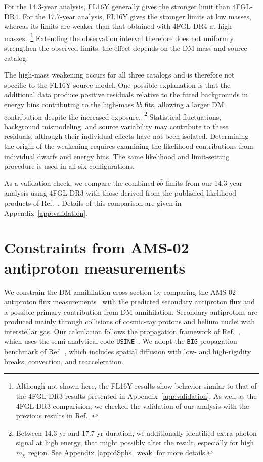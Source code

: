 \documentclass[superscriptaddress,
showpacs,preprintnumbers,nofootinbib,eqsecnum,amsmath,amssymb,aps,11pt, groupedaddress, floatfix]{revtex4-2}
\begin{document}
For the 14.3-year analysis, FL16Y generally gives the stronger limit than 4FGL-DR4.
For the 17.7-year analysis, FL16Y gives the stronger
limits at low masses, whereas its limits are weaker than that obtained with 4FGL-DR4 at high masses.~\footnote{Although not shown here, the FL16Y results show
behavior similar to that of the 4FGL-DR3 results presented
in Appendix~\ref{app:validation}. As well as the 4FGL-DR3 comparision, we checked the validation of our analysis with the previous results in Ref. \cite{McDaniel:2023bju}.}
Extending the observation interval therefore does not uniformly strengthen the observed limits; the effect depends on the DM mass and source catalog.

The high-mass weakening occurs for all three catalogs and is therefore not specific to the FL16Y source model.
One possible explanation is that the additional data produce positive residuals relative to the fitted backgrounds in energy bins contributing to the high-mass $b\bar b$ fits, allowing a larger DM contribution despite the increased exposure.~\footnote{Between 14.3 yr and 17.7 yr duration, we additionally identified extra photon signal at high energy, that might possibly alter the result, especially for high $m_\chi$ region. See Appendix~\ref{app:dSphs_weak} for more details.}
Statistical fluctuations, background mismodeling, and
source variability may contribute to these residuals, although their individual effects have not been isolated.
Determining the origin of the weakening requires examining the likelihood contributions from individual dwarfs and energy bins.
The same likelihood and limit-setting procedure is used in all six configurations.

As a validation check, we compare the combined $b \bar b$ limits from our 14.3-year analysis using 4FGL-DR3 with those derived from the published likelihood products of
Ref.~\cite{McDaniel:2023bju}.
Details of this comparison are given in Appendix~\ref{app:validation}.





\section{Constraints from AMS-02 antiproton measurements}
\label{sec:AMS-02}

We constrain the DM annihilation cross section by comparing the
AMS-02 antiproton flux measurements~\cite{AMS:2016oqu} with the predicted secondary antiproton flux and a possible primary contribution from DM annihilation.
Secondary antiprotons are produced mainly through collisions of cosmic-ray protons and helium nuclei with interstellar gas.
Our calculation follows the propagation framework of
Ref.~\cite{Calore:2022stf}, which uses the semi-analytical code
\texttt{USINE}~\cite{Maurin:2018rmm}.
We adopt the \texttt{BIG} propagation benchmark of
Ref.~\cite{Genolini:2019ewc}, which includes spatial diffusion
with low- and high-rigidity breaks, convection, and reacceleration.
\end{document}
